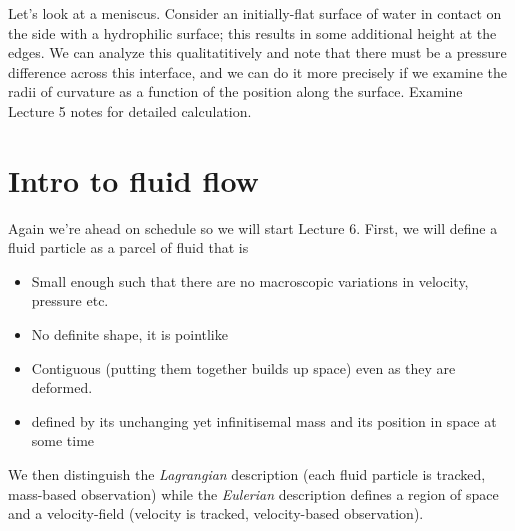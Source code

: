 \documentclass[10pt]{report}
\begin{document}
Let's look at a meniscus. Consider an initially-flat surface of water in contact on the side with a hydrophilic surface; this results in some additional height at the edges. We can analyze this qualitatitively and note that there must be a pressure difference across this interface, and we can do it more precisely if we examine the radii of curvature as a function of the position along the surface. Examine Lecture 5 notes for detailed calculation.

\section{Intro to fluid flow}

Again we're ahead on schedule so we will start Lecture 6. First, we will define a fluid particle as a parcel of fluid that is
\begin{itemize}
    \item Small enough such that there are no macroscopic variations in velocity, pressure etc.
    \item No definite shape, it is pointlike
    \item Contiguous (putting them together builds up space) even as they are deformed.
    \item defined by its unchanging yet infinitisemal mass and its position in space at some time
\end{itemize}

We then distinguish the \emph{Lagrangian} description (each fluid particle is tracked, mass-based observation) while the \emph{Eulerian} description defines a region of space and a velocity-field (velocity is tracked, velocity-based observation).
\end{document}
